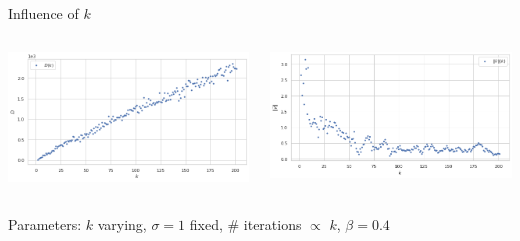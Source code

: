 \documentclass{beamer}
\begin{document}
\begin{frame}{Influence of $k$}
	\begin{minipage}[0.95\textheight]{\textwidth}
	\begin{columns}[T]
	\begin{column}{0.50\textwidth}
	\includegraphics[width=\textwidth, keepaspectratio]{../images/D_N.png}
	\end{column}
	\begin{column}{0.50\textwidth}
	\includegraphics[width=\textwidth, keepaspectratio]{../images/v_N.png}
	\end{column}
	\end{columns}
	\end{minipage}
	\begin{center}
		Parameters: $k$ varying, $\sigma=1$ fixed, \# iterations $\propto$ $k$, $\beta=0.4$
	\end{center}
\end{frame}
\end{document}
